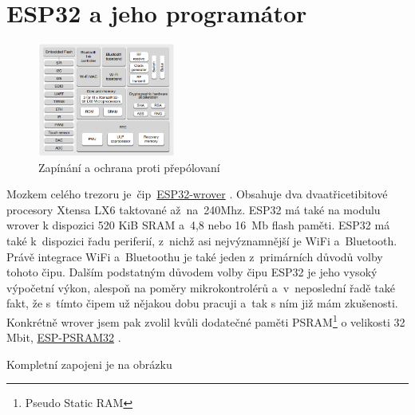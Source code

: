 \section{ESP32 a jeho programátor}

\begin{figure}
    \centering
    \includegraphics[width=0.4\textwidth]{kapitoly/obrazky/E4/ESP32/BlockDiagram.png}
    \caption{\label{fig:E4-ESP32-BlockDiagram}Zapínání a ochrana proti přepólovaní}
\end{figure}

Mozkem celého trezoru je~čip~\href{https://www.espressif.com/sites/default/files/documentation/esp32-wrover-b_datasheet_en.pdf}{ESP32-wrover} \parencite{ESP32-WROVER-B}. 
Obsahuje dva dva\-a\-tři\-ce\-ti\-bi\-to\-vé procesory Xtensa LX6 taktované až~na~240Mhz. ESP32 \parencite{ESP32} má také na modulu wrover k dispozici 520 KiB SRAM 
a~4,8 nebo 16~Mb flash paměti. ESP32 má také k~dispozici řadu periferií, z~nichž asi nejvýznamnější je WiFi a~Bluetooth. Právě integrace 
WiFi a~Bluetoothu je také jeden z~primárních důvodů volby tohoto čipu. Dalším podstatným důvodem volby čipu ESP32 je jeho vysoký výpočetní výkon, 
alespoň na poměry mikrokontrolérů a~v~neposlední řadě také fakt, že s~tímto čipem už nějakou dobu pracuji a~tak s ním již mám zkušenosti. 
Konkrétně wrover jsem pak zvolil kvůli dodatečné paměti PSRAM\footnote{Pseudo Static RAM} o velikosti 32 Mbit, 
\href{http://gamma.spb.ru/images/pdf/esp-psram32_datasheet_en.pdf}{ESP-PSRAM32} \parencite{ESP-PSRAM32}.

Kompletní zapojeni je na obrázku 


